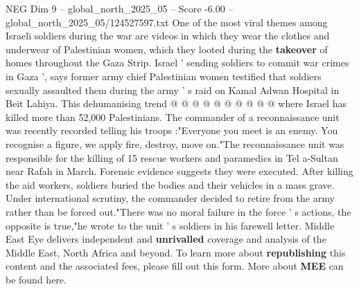 \begin{textsample}{NEG Dim 9 – global\_north\_2025\_05 – Score -6.00 – global\_north\_2025\_05/124527597.txt}
One of the most viral themes among Israeli soldiers during the war are videos in which they wear the clothes and underwear of Palestinian women, which they looted during the \textbf{takeover} of homes throughout the Gaza Strip.
Israel ' sending soldiers to commit war crimes in Gaza ', says former army chief Palestinian women testified that soldiers sexually assaulted them during the army ' s raid on Kamal Adwan Hospital in Beit Lahiya.
This dehumanising trend @ @ @ @ @ @ @ @ @ @ where Israel has killed more than 52,000 Palestinians.
The commander of a reconnaissance unit was recently recorded telling his troops :"Everyone you meet is an enemy.
You recognise a figure, we apply fire, destroy, move on."The reconnaissance unit was responsible for the killing of 15 rescue workers and paramedics in Tel a-Sultan near Rafah in March.
Forensic evidence suggests they were executed.
After killing the aid workers, soldiers buried the bodies and their vehicles in a mass grave.
Under international scrutiny, the commander decided to retire from the army rather than be forced out."There was no moral failure in the force ' s actions, the opposite is true,"he wrote to the unit ' s soldiers in his farewell letter.
Middle East Eye delivers independent and \textbf{unrivalled} coverage and analysis of the Middle East, North Africa and beyond.
To learn more about \textbf{republishing} this content and the associated fees, please fill out this form.
More about \textbf{MEE} can be found here.

\end{textsample}
